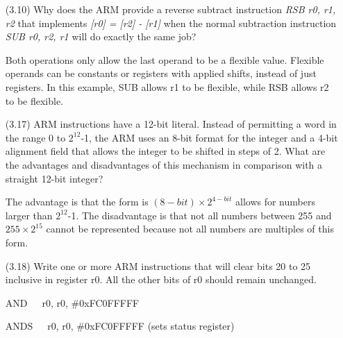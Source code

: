 \documentclass[letterpaper,10pt,titlepage]{article}
\begin{document}
\begin{enumerate}
	\item[(3.10)] Why does the ARM provide a reverse subtract instruction \textit{RSB
		r0, r1, r2} that implements \textit{[r0] = [r2] - [r1]} when the normal
		subtraction instruction \textit{SUB  r0, r2, r1} will do exactly the same
		job?
	\item[\textbullet] Both operations only allow the last operand to be a flexible
		value. Flexible operands can be constants or registers with applied 
		shifts, instead of just registers. In this example, SUB allows r1 to be 
		flexible, while RSB allows r2 to be flexible. 

	\item[(3.17)] ARM instructions have a 12-bit literal. Instead of permitting a word
		in the range 0 to $2^{12}$-1, the ARM uses an 8-bit format for the integer
		and a 4-bit alignment field that allows the integer to be shifted in steps
		of 2. What are the advantages and disadvantages of this mechanism in
		comparison with a straight 12-bit integer?
	\item[\textbullet] The advantage is that the form is $(8-bit) \times  2^{4-bit}$ 
		allows for numbers larger than $2^{12}$-1. The disadvantage is that
		not all numbers between 255 and $255 \times 2^{15}$ cannot be represented 
		because not all numbers are multiples of this form.

	\item[(3.18)] Write one or more ARM instructions that will clear bits 20 to 25
		inclusive in register r0. All the other bits of r0 should remain
		unchanged.
	\item[\textbullet] AND\ \ \ r0, r0, \#0xFC0FFFFF
	\item[\textbullet] ANDS\ \ \ r0, r0, \#0xFC0FFFFF (sets status register)


\end{enumerate}
\end{document}
